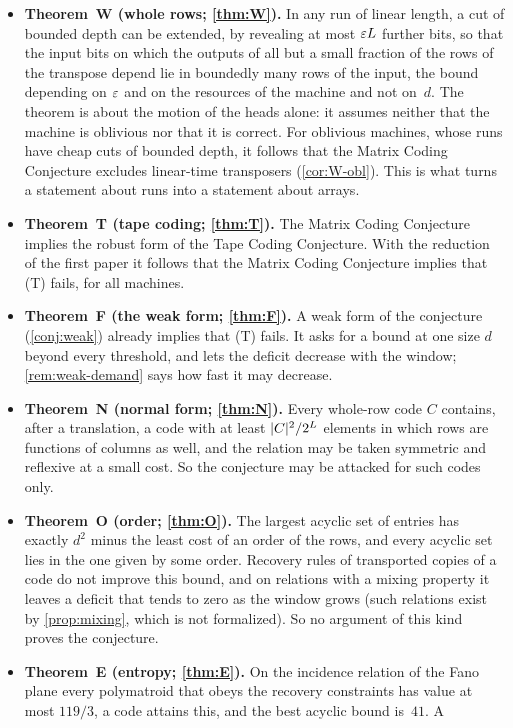 \begin{itemize}[leftmargin=1.5em]
\item \textbf{Theorem~W (whole rows; \cref{thm:W}).} In any run of linear length, a cut of bounded depth can be
extended, by revealing at most $\varepsilon L$ further bits, so that the input bits on which the outputs of all but a small
fraction of the rows of the transpose depend lie in boundedly many rows of the input, the bound depending on $\varepsilon$
and on the resources of the machine and not on~$d$. The theorem is about the motion of the heads alone: it assumes
neither that the machine is oblivious nor that it is correct. For oblivious machines, whose runs have cheap cuts of
bounded depth, it follows that the Matrix Coding Conjecture excludes linear-time transposers (\cref{cor:W-obl}). This is what turns a statement about runs into a statement about arrays.
\item \textbf{Theorem~T (tape coding; \cref{thm:T}).} The Matrix Coding Conjecture implies the robust form of the Tape
Coding Conjecture. With the reduction of the first paper it follows that the Matrix Coding Conjecture implies that
(T) fails, for all machines.
\item \textbf{Theorem~F (the weak form; \cref{thm:F}).} A weak form of the conjecture (\cref{conj:weak}) already
implies that (T) fails. It asks for a bound at one size $d$ beyond every threshold, and lets the deficit decrease
with the window; \cref{rem:weak-demand} says how fast it may decrease.
\item \textbf{Theorem~N (normal form; \cref{thm:N}).} Every whole-row code $C$ contains, after a translation, a code
with at least $\lvert C \rvert^2/2^{L}$ elements in which rows are functions of columns as well, and the relation may be taken
symmetric and reflexive at a small cost. So the conjecture may be attacked for such codes only.
\item \textbf{Theorem~O (order; \cref{thm:O}).} The largest acyclic set of entries has exactly $d^2$ minus the least
cost of an order of the rows, and every acyclic set lies in the one given by some order. Recovery rules of
transported copies of a code do not improve this bound, and on relations with a mixing property it leaves a deficit
that tends to zero as the window grows (such relations exist by \cref{prop:mixing}, which is not formalized). So no argument of this kind proves the conjecture.
\item \textbf{Theorem~E (entropy; \cref{thm:E}).} On the incidence relation of the Fano plane every polymatroid that
obeys the recovery constraints has value at most $119/3$, a code attains this, and the best acyclic bound is~$41$. A

\end{itemize}
